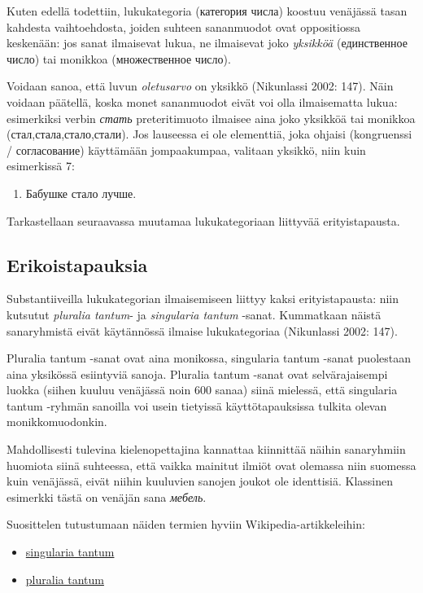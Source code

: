 \documentclass[]{scrreprt}
\providecommand{\tightlist}{%
  \setlength{\itemsep}{0pt}\setlength{\parskip}{0pt}}
\begin{document}
Kuten edellä todettiin, lukukategoria (категория числа) koostuu
venäjässä tasan kahdesta vaihtoehdosta, joiden suhteen sananmuodot ovat
oppositiossa keskenään: jos sanat ilmaisevat lukua, ne ilmaisevat joko
\emph{yksikköä} (единственное число) tai monikkoa (множественное число).

Voidaan sanoa, että luvun \emph{oletusarvo} on yksikkö (Nikunlassi 2002:
147). Näin voidaan päätellä, koska monet sananmuodot eivät voi olla
ilmaisematta lukua: esimerkiksi verbin \emph{стать} preteritimuoto
ilmaisee aina joko yksikköä tai monikkoa (стал,стала,стало,стали). Jos
lauseessa ei ole elementtiä, joka ohjaisi (kongruenssi / согласование)
käyttämään jompaakumpaa, valitaan yksikkö, niin kuin esimerkissä 7:

\begin{enumerate}
\def\labelenumi{(\arabic{enumi})}
\setcounter{enumi}{6}
\tightlist
\item
  Бабушке стало лучше.
\end{enumerate}

Tarkastellaan seuraavassa muutamaa lukukategoriaan liittyvää
erityistapausta.

\subsection{Erikoistapauksia}\label{erikoistapauksia}

Substantiiveilla lukukategorian ilmaisemiseen liittyy kaksi
erityistapausta: niin kutsutut \emph{pluralia tantum}- ja
\emph{singularia tantum} -sanat. Kummatkaan näistä sanaryhmistä eivät
käytännössä ilmaise lukukategoriaa (Nikunlassi 2002: 147).

Pluralia tantum -sanat ovat aina monikossa, singularia tantum -sanat
puolestaan aina yksikössä esiintyviä sanoja. Pluralia tantum -sanat ovat
selvärajaisempi luokka (siihen kuuluu venäjässä noin 600 sanaa) siinä
mielessä, että singularia tantum -ryhmän sanoilla voi usein tietyissä
käyttötapauksissa tulkita olevan monikkomuodonkin.

Mahdollisesti tulevina kielenopettajina kannattaa kiinnittää näihin
sanaryhmiin huomiota siinä suhteessa, että vaikka mainitut ilmiöt ovat
olemassa niin suomessa kuin venäjässä, eivät niihin kuuluvien sanojen
joukot ole identtisiä. Klassinen esimerkki tästä on venäjän sana
\emph{мебель}.

Suosittelen tutustumaan näiden termien hyviin Wikipedia-artikkeleihin:

\begin{itemize}
\tightlist
\item
  \href{https://ru.wikipedia.org/wiki/Singularia_tantum}{singularia
  tantum}
\item
  \href{https://ru.wikipedia.org/wiki/Pluralia_tantum}{pluralia tantum}
\end{itemize}
\end{document}

